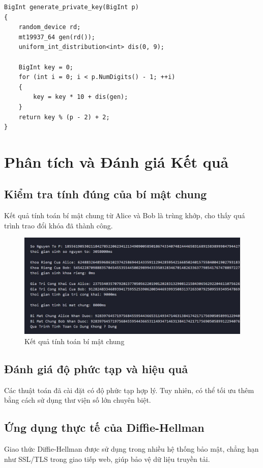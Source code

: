 \documentclass[a4paper,12pt]{article}
\begin{document}
\begin{lstlisting}
BigInt generate_private_key(BigInt p)
{
    random_device rd;
    mt19937_64 gen(rd());
    uniform_int_distribution<int> dis(0, 9);

    BigInt key = 0;
    for (int i = 0; i < p.NumDigits() - 1; ++i)
    {
        key = key * 10 + dis(gen);
    }
    return key % (p - 2) + 2;
}

\end{lstlisting}


\newpage
\section{Phân tích và Đánh giá Kết quả}
\subsection{Kiểm tra tính đúng của bí mật chung}
Kết quả tính toán bí mật chung từ Alice và Bob là trùng khớp, cho thấy quá trình trao đổi khóa đã thành công.
\begin{figure}[h]
    \centering
    \includegraphics[width=1\textwidth]{output.png}
    \caption{Kết quả tính toán bí mật chung}
    \label{fig:output}
\end{figure}

\subsection{Đánh giá độ phức tạp và hiệu quả}
Các thuật toán đã cài đặt có độ phức tạp hợp lý. Tuy nhiên, có thể tối ưu thêm bằng cách sử dụng thư viện số lớn chuyên biệt.

\subsection{Ứng dụng thực tế của Diffie-Hellman}
Giao thức Diffie-Hellman được sử dụng trong nhiều hệ thống bảo mật, chẳng hạn như SSL/TLS trong giao tiếp web, giúp bảo vệ dữ liệu truyền tải.
\end{document}

